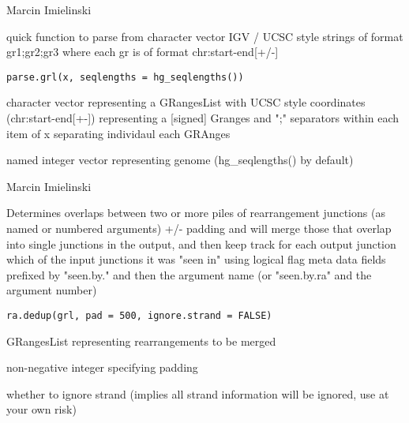 \documentclass[a4paper]{book}
\begin{document}
%
\begin{Author}\relax
Marcin Imielinski
\end{Author}
%
\begin{Description}\relax
quick function to parse  from character vector IGV / UCSC style strings of format gr1;gr2;gr3 where each gr is of format chr:start-end[+/-]
\end{Description}
%
\begin{Usage}
\begin{verbatim}
parse.grl(x, seqlengths = hg_seqlengths())
\end{verbatim}
\end{Usage}
%
\begin{Arguments}
\begin{ldescription}
\item[\code{x}] character vector representing a GRangesList with UCSC style coordinates (chr:start-end[+-]) representing a [signed] Granges and  ";" separators within each item of x separating individaul each GRAnges

\item[\code{seqlengths}] named integer vector representing genome (hg\_seqlengths() by default)
\end{ldescription}
\end{Arguments}
%
\begin{Author}\relax
Marcin Imielinski
\end{Author}
%
\begin{Description}\relax
Determines overlaps between two or more piles of rearrangement junctions (as named or numbered arguments) +/- padding
and will merge those that overlap into single junctions in the output, and then keep track for each output junction which
of the input junctions it was "seen in" using logical flag  meta data fields prefixed by "seen.by." and then the argument name
(or "seen.by.ra" and the argument number)
\end{Description}
%
\begin{Usage}
\begin{verbatim}
ra.dedup(grl, pad = 500, ignore.strand = FALSE)
\end{verbatim}
\end{Usage}
%
\begin{Arguments}
\begin{ldescription}
\item[\code{grl}] GRangesList representing rearrangements to be merged

\item[\code{pad}] non-negative integer specifying padding

\item[\code{ignore.strand}] whether to ignore strand (implies all strand information will be ignored, use at your own risk)
\end{ldescription}
\end{Arguments}
\end{document}
